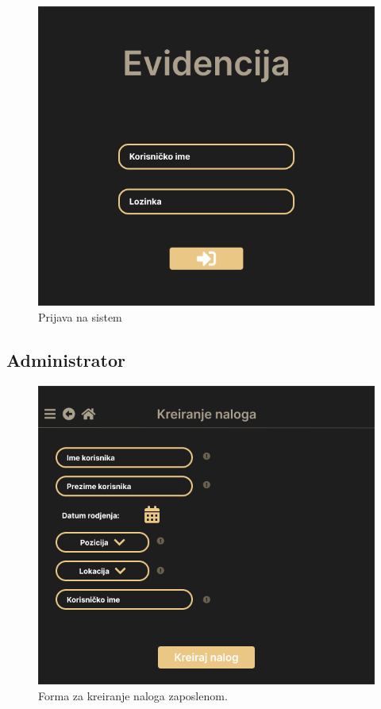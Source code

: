 \documentclass[a4paper]{article}
\begin{document}
\begin{figure} [!ht]
    \begin{center}
        \includegraphics[scale=0.5]{UI/LoginPage.png}
    \end{center}
\caption{Prijava na sistem}
\end{figure}

\newpage
\subsection{Administrator}

\begin{figure} [!ht]
    \begin{center}
        \includegraphics[scale=0.33]{UI/Administrator/Administrator_KreiranjeNaloga_Forma.png}
    \end{center}
\caption{Forma za kreiranje naloga zaposlenom.}
\end{figure}
\end{document}
